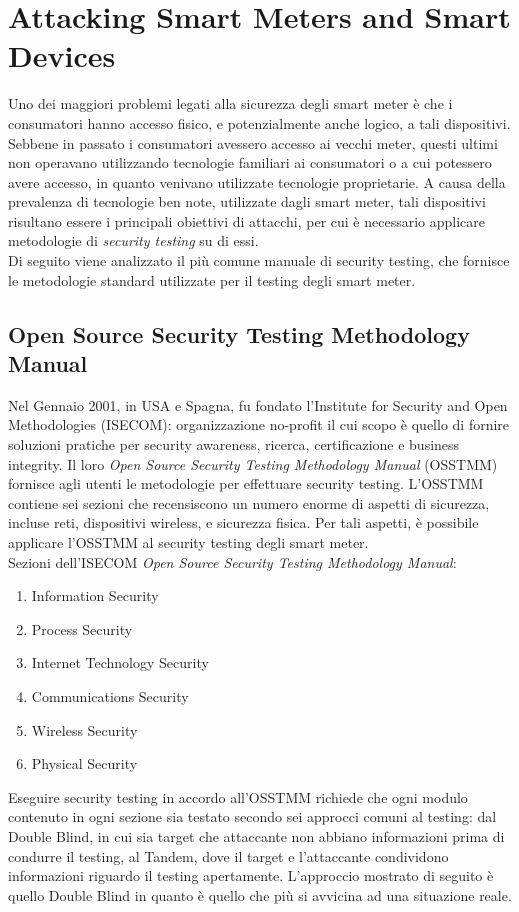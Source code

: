 \section{Attacking Smart Meters and Smart Devices}
Uno dei maggiori problemi legati alla sicurezza degli smart meter è che i consumatori hanno accesso fisico, e potenzialmente anche logico, a tali dispositivi. Sebbene in passato i consumatori avessero accesso ai vecchi meter, questi ultimi non operavano utilizzando tecnologie familiari ai consumatori o a cui potessero avere accesso, in quanto venivano utilizzate tecnologie proprietarie. A causa della prevalenza di tecnologie ben note, utilizzate dagli smart meter, tali dispositivi risultano essere i principali obiettivi di attacchi, per cui è necessario applicare metodologie di \emph{security testing} su di essi.\\
Di seguito viene analizzato il più comune manuale di security testing, che fornisce le metodologie standard utilizzate per il testing degli smart meter.

\subsection{Open Source Security Testing Methodology Manual}
Nel Gennaio 2001, in USA e Spagna, fu fondato l'Institute for Security and Open Methodologies (ISECOM): organizzazione no-profit il cui scopo è quello di fornire soluzioni pratiche per security awareness, ricerca, certificazione e business integrity. Il loro \emph{Open Source Security Testing Methodology Manual} (OSSTMM) fornisce agli utenti le metodologie per effettuare security testing. L'OSSTMM contiene sei sezioni che recensiscono un numero enorme di aspetti di sicurezza, incluse reti, dispositivi wireless, e sicurezza fisica. Per tali aspetti, è possibile applicare l'OSSTMM al security testing degli smart meter.\\
Sezioni dell'ISECOM \emph{Open Source Security Testing Methodology Manual}:
\begin{enumerate}
	\item Information Security
	\item Process Security
	\item Internet Technology Security
	\item Communications Security
	\item Wireless Security
	\item Physical Security
\end{enumerate}
Eseguire security testing in accordo all'OSSTMM richiede che ogni modulo contenuto in ogni sezione sia testato secondo sei approcci comuni al testing: dal Double Blind, in cui sia target che attaccante non abbiano informazioni prima di condurre il testing, al Tandem, dove il target e l'attaccante condividono informazioni riguardo il testing apertamente. L'approccio mostrato di seguito è quello Double Blind in quanto è quello che più si avvicina ad una situazione reale.
